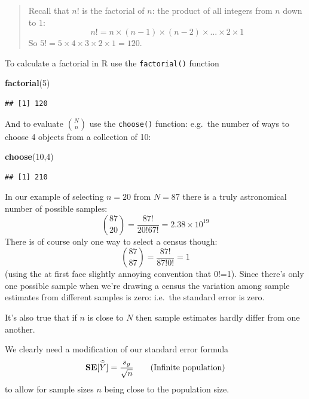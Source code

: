 \documentclass[
]{book}
\newenvironment{Shaded}{\begin{snugshade}}{\end{snugshade}}
\newcommand{\DecValTok}[1]{\textcolor[rgb]{0.00,0.00,0.81}{#1}}
\newcommand{\FunctionTok}[1]{\textcolor[rgb]{0.13,0.29,0.53}{\textbf{#1}}}
\newcommand{\NormalTok}[1]{#1}
\newcommand{\bfa}[2]{{\rm\bf #1}[#2]}
\begin{document}
\begin{quote}
Recall that \(n!\) is the factorial of \(n\): the product of all integers
from \(n\) down to \(1\):
\[
    n! = n\times(n-1)\times(n-2)\times ... \times 2 \times 1
\]
So \(5!=5\times 4\times 3\times 2\times 1=120\).
\end{quote}

To calculate a factorial in R use the \texttt{factorial()} function

\begin{Shaded}
\begin{Highlighting}[]
\FunctionTok{factorial}\NormalTok{(}\DecValTok{5}\NormalTok{)}
\end{Highlighting}
\end{Shaded}

\begin{verbatim}
## [1] 120
\end{verbatim}

And to evaluate \(\binom{N}{n}\) use the \texttt{choose()} function: e.g.~the
number of ways to choose 4 objects from a collection of 10:

\begin{Shaded}
\begin{Highlighting}[]
\FunctionTok{choose}\NormalTok{(}\DecValTok{10}\NormalTok{,}\DecValTok{4}\NormalTok{)}
\end{Highlighting}
\end{Shaded}

\begin{verbatim}
## [1] 210
\end{verbatim}

In our example of selecting \(n=20\) from \(N=87\) there is a truly astronomical
number of possible samples:
\[
   \binom{87}{20} = \frac{87!}{20!67!} = 2.38\times 10^{19}
\]
There is of course only one way to select a census though:
\[  
   \binom{87}{87} = \frac{87!}{87!0!} = 1
\]
(using the at first face slightly annoying convention that 0!=1). Since there's only
one possible sample when we're drawing a census the variation among sample estimates
from different samples is zero: i.e.~the standard error is zero.

It's also true that if \(n\) is close to \(N\) then sample estimates hardly differ from
one another.

We clearly need a modification of our standard error formula
\[
   \bfa{SE}{\widehat{\bar{Y}}} = \frac{s_y}{\sqrt{n}}
   \qquad \text{(Infinite population)}
\]
to allow for sample sizes \(n\) being close to the population size.
\end{document}
